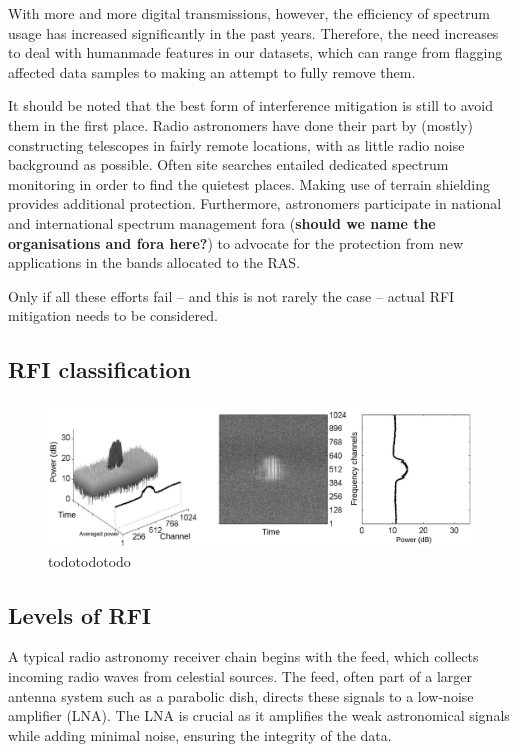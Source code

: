 With more and more digital transmissions, however, the efficiency of spectrum usage has increased significantly in the past years. Therefore, the need increases to deal with humanmade features in our datasets, which can range from flagging affected data samples to making an attempt to fully remove them.

It should be noted that the best form of interference mitigation is still to avoid them in the first place. Radio astronomers have done their part by (mostly) constructing telescopes in fairly remote locations, with as little radio noise background as possible. Often site searches entailed dedicated spectrum monitoring in order to find the quietest places. Making use of terrain shielding provides additional protection. Furthermore, astronomers participate in national and international spectrum management fora (\textbf{should we name the organisations and fora here?}) to advocate for the protection from new applications in the bands allocated to the RAS.

Only if all these efforts fail -- and this is not rarely the case -- actual RFI mitigation needs to be considered.

\subsection{RFI classification}
\label{subsection:hardware:introduction:classification}

\begin{figure}
    \centering
    \includegraphics[height=.20\textheight]{figures/radar.pdf}
    \caption{todotodotodo}
    \label{fig:rfi_example_radar}
\end{figure}

\subsection{Levels of RFI}
\label{subsection:hardware:introduction:levels}
A typical radio astronomy receiver chain begins with the feed, which collects incoming radio waves from celestial sources. The feed, often part of a larger antenna system such as a parabolic dish, directs these signals to a low-noise amplifier (LNA). The LNA is crucial as it amplifies the weak astronomical signals while adding minimal noise, ensuring the integrity of the data.

